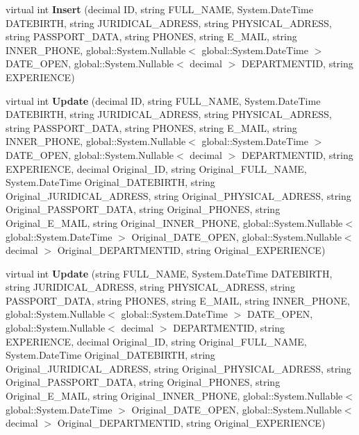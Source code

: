 \begin{CompactItemize}
\item 
virtual int \textbf{Insert} (decimal ID, string FULL\_\-NAME, System.DateTime DATEBIRTH, string JURIDICAL\_\-ADRESS, string PHYSICAL\_\-ADRESS, string PASSPORT\_\-DATA, string PHONES, string E\_\-MAIL, string INNER\_\-PHONE, global::System.Nullable$<$ global::System.DateTime $>$ DATE\_\-OPEN, global::System.Nullable$<$ decimal $>$ DEPARTMENTID, string EXPERIENCE)\label{class_automatic_medical_system_1_1_data_set2_table_adapters_1_1_d_o_c_t_o_r_s_table_adapter_6139af3c1fb9683a3ad29e7c524fc30a}

\item 
virtual int \textbf{Update} (decimal ID, string FULL\_\-NAME, System.DateTime DATEBIRTH, string JURIDICAL\_\-ADRESS, string PHYSICAL\_\-ADRESS, string PASSPORT\_\-DATA, string PHONES, string E\_\-MAIL, string INNER\_\-PHONE, global::System.Nullable$<$ global::System.DateTime $>$ DATE\_\-OPEN, global::System.Nullable$<$ decimal $>$ DEPARTMENTID, string EXPERIENCE, decimal Original\_\-ID, string Original\_\-FULL\_\-NAME, System.DateTime Original\_\-DATEBIRTH, string Original\_\-JURIDICAL\_\-ADRESS, string Original\_\-PHYSICAL\_\-ADRESS, string Original\_\-PASSPORT\_\-DATA, string Original\_\-PHONES, string Original\_\-E\_\-MAIL, string Original\_\-INNER\_\-PHONE, global::System.Nullable$<$ global::System.DateTime $>$ Original\_\-DATE\_\-OPEN, global::System.Nullable$<$ decimal $>$ Original\_\-DEPARTMENTID, string Original\_\-EXPERIENCE)\label{class_automatic_medical_system_1_1_data_set2_table_adapters_1_1_d_o_c_t_o_r_s_table_adapter_61a444319ac6842b2b8933bd9f7d028d}

\item 
virtual int \textbf{Update} (string FULL\_\-NAME, System.DateTime DATEBIRTH, string JURIDICAL\_\-ADRESS, string PHYSICAL\_\-ADRESS, string PASSPORT\_\-DATA, string PHONES, string E\_\-MAIL, string INNER\_\-PHONE, global::System.Nullable$<$ global::System.DateTime $>$ DATE\_\-OPEN, global::System.Nullable$<$ decimal $>$ DEPARTMENTID, string EXPERIENCE, decimal Original\_\-ID, string Original\_\-FULL\_\-NAME, System.DateTime Original\_\-DATEBIRTH, string Original\_\-JURIDICAL\_\-ADRESS, string Original\_\-PHYSICAL\_\-ADRESS, string Original\_\-PASSPORT\_\-DATA, string Original\_\-PHONES, string Original\_\-E\_\-MAIL, string Original\_\-INNER\_\-PHONE, global::System.Nullable$<$ global::System.DateTime $>$ Original\_\-DATE\_\-OPEN, global::System.Nullable$<$ decimal $>$ Original\_\-DEPARTMENTID, string Original\_\-EXPERIENCE)\label{class_automatic_medical_system_1_1_data_set2_table_adapters_1_1_d_o_c_t_o_r_s_table_adapter_cfa366f188533ae28a1fe8891b1fe29c}

\end{CompactItemize}
